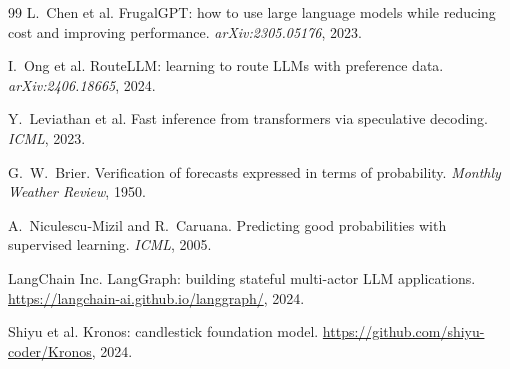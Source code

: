 \documentclass[11pt,a4paper]{article}
\begin{document}
\begin{thebibliography}{99}
L.~Chen et al. FrugalGPT: how to use large language models while reducing
cost and improving performance. \emph{arXiv:2305.05176}, 2023.

I.~Ong et al. RouteLLM: learning to route LLMs with preference data.
\emph{arXiv:2406.18665}, 2024.

Y.~Leviathan et al. Fast inference from transformers via speculative decoding.
\emph{ICML}, 2023.

G.~W.~Brier. Verification of forecasts expressed in terms of probability.
\emph{Monthly Weather Review}, 1950.

A.~Niculescu-Mizil and R.~Caruana. Predicting good probabilities with
supervised learning. \emph{ICML}, 2005.

LangChain Inc. LangGraph: building stateful multi-actor LLM applications.
\url{https://langchain-ai.github.io/langgraph/}, 2024.

Shiyu et al. Kronos: candlestick foundation model.
\url{https://github.com/shiyu-coder/Kronos}, 2024.

\end{thebibliography}
\end{document}
